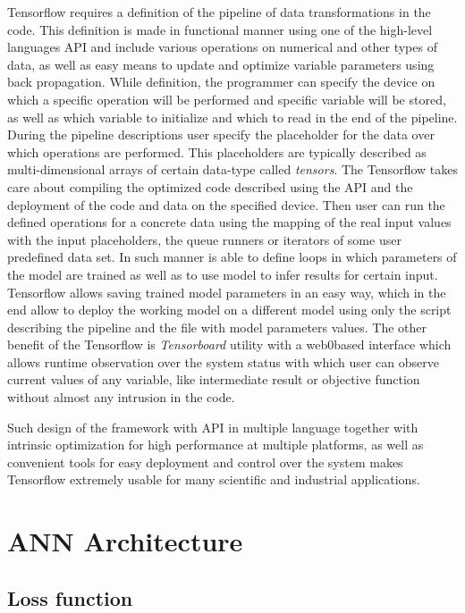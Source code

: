 Tensorflow requires a definition of the pipeline of data transformations in the code.
This definition is made in functional manner using one of the high-level languages API and include various operations on numerical and other types of data, as well as easy means to update and optimize variable parameters using back propagation. 
While definition, the programmer can specify the device on which a specific operation will be performed and specific variable will be stored, as well as which variable to initialize and which to read in the end of the pipeline. 
During the pipeline descriptions user specify the placeholder for the data over which operations are performed. 
This placeholders are typically described as multi-dimensional arrays of certain data-type called \textit{tensors}.
The Tensorflow takes care about compiling the optimized code described using the API and the deployment of the code and data on the specified device. 
Then user can run the defined operations for a concrete data using the mapping of the real input values with the input placeholders, the queue runners or iterators of some user predefined data set.
In such manner is able to define loops in which parameters of the model are trained as well as to use model to infer results for certain input.
Tensorflow allows saving trained model parameters in an easy way, which in the end allow to deploy the working model on a different model using only the script describing the pipeline and the file with model parameters values.
The other benefit of the Tensorflow is \textit{Tensorboard} utility with a web0based interface which allows runtime observation over the system status with which user can observe current values of any variable, like intermediate result or objective function without almost any intrusion in the code.

Such design of the framework with API in multiple language together with intrinsic optimization for high performance at multiple platforms, as well as convenient tools for easy deployment and control over the system makes Tensorflow extremely usable for many scientific and industrial applications.


\section{ANN Architecture}

\subsection{Loss function}

